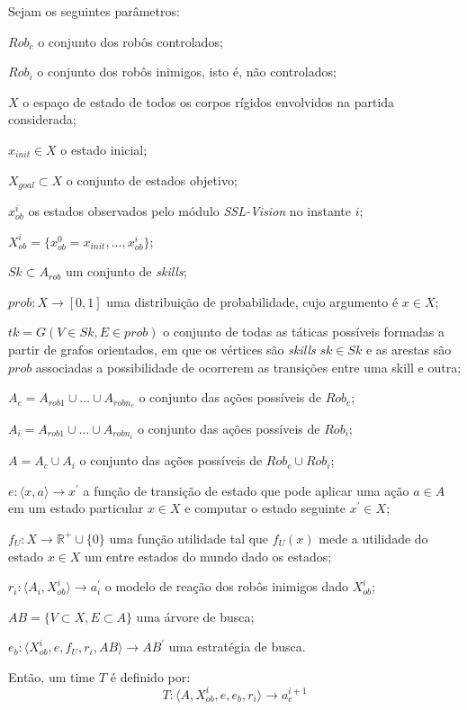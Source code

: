 \begin{defi}[Time]\label{def:time}
  Sejam os seguintes parâmetros:

  \begin{description}
    \item $Rob_c$ o conjunto dos robôs controlados;
    \item $Rob_i$ o conjunto dos robôs inimigos, isto é, não controlados;
    \item $X$ o espaço de estado de todos os corpos rígidos envolvidos na partida considerada;
    \item $x_{init} \in X$ o estado inicial;
    \item $X_{goal}\subset X$ o conjunto de estados objetivo;
    \item $x_{ob}^{i}$ os estados observados pelo módulo \textit{SSL-Vision} no instante $i$;
    \item $X_{ob}^{i} =  \lbrace{x_{ob}^{0} = x_{init},\dots,x_{ob}^{i}}\rbrace$;
    \item $Sk \subset A_{rob}$ um conjunto de \textit{skills};
    \item $prob: X \longrightarrow [0,1]$ uma distribuição de probabilidade, cujo argumento é
          $x \in X$;
    \item $tk = G(V \in Sk, E \in {prob} )$ o conjunto de todas as táticas possíveis
          formadas a partir de grafos orientados, em que os vértices são \textit{skills} $sk \in Sk$
          e as arestas são $prob$ associadas a possibilidade de ocorrerem as transições
          entre uma skill e outra;
    \item $A_c = A_{rob 1} \cup \dots \cup A_{rob n_c}$ o conjunto das ações possíveis de $Rob_c$;
    \item $A_i = A_{rob 1} \cup \dots \cup A_{rob n_i}$ o conjunto das ações possíveis de $Rob_i$;
    \item $A = A_c \cup A_i$ o conjunto das ações possíveis de $Rob_c \cup Rob_i$;
    \item $e: \langle x,a \rangle \longrightarrow x^{'}$ a função de transição de estado que pode aplicar uma ação $a\in A$ em um estado particular
          $x \in X$ e computar o estado seguinte $x^{'} \in X$;
    \item $f_{U}: X \longrightarrow \mathbb{R^{+}} \cup\lbrace 0\rbrace$ uma função utilidade tal que
          $f_{U}(x)$ mede a utilidade do estado $x \in X$ um entre estados do mundo dado os estados;
    \item $r_i: \langle A_i, X_{ob}^{i}\rangle \longrightarrow a_i^{'}$ o modelo de reação dos robôs
          inimigos dado $X_{ob}^{i}$;
    \item $AB =\lbrace V \subset X, E \subset A\rbrace$ uma árvore de busca;
    \item $e_b: \langle X_{ob}^{i}, e, f_{U}, r_i, AB\rangle \longrightarrow AB^{'}$ uma estratégia de busca.

  \end{description}

  Então, um time $T$ é definido por:
  \[
    T: \langle A, X_{ob}^{i}, e, e_b, r_i \rangle \longrightarrow a_c^{i+1}
  \]
\end{defi}

